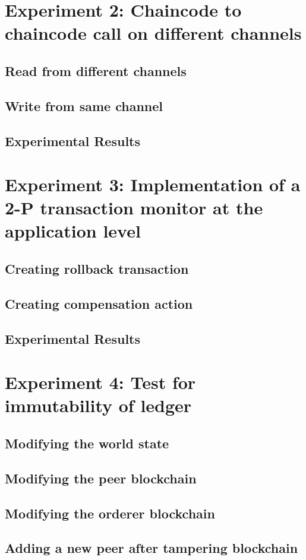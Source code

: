 \documentclass[
  a4paper,  %
  twoside,  %
  bibliography=totoc,
  headsepline,
  cleardoublepage=empty,
  parskip=half,
  draft=false
]{scrbook}
\begin{document}
\section{Experiment 2: Chaincode to chaincode call on different channels}
\subsection{Read from different channels}
\subsection{Write from same channel}
\subsection{Experimental Results}

\section{Experiment 3: Implementation of a 2-P transaction monitor at the application level}
\subsection{Creating rollback transaction}
\subsection{Creating compensation action}
\subsection{Experimental Results}

\section{Experiment 4: Test for immutability of ledger}
\subsection{Modifying the world state}
\subsection{Modifying the peer blockchain}
\subsection{Modifying the orderer blockchain}
\subsection{Adding a new peer after tampering blockchain}
\end{document}
